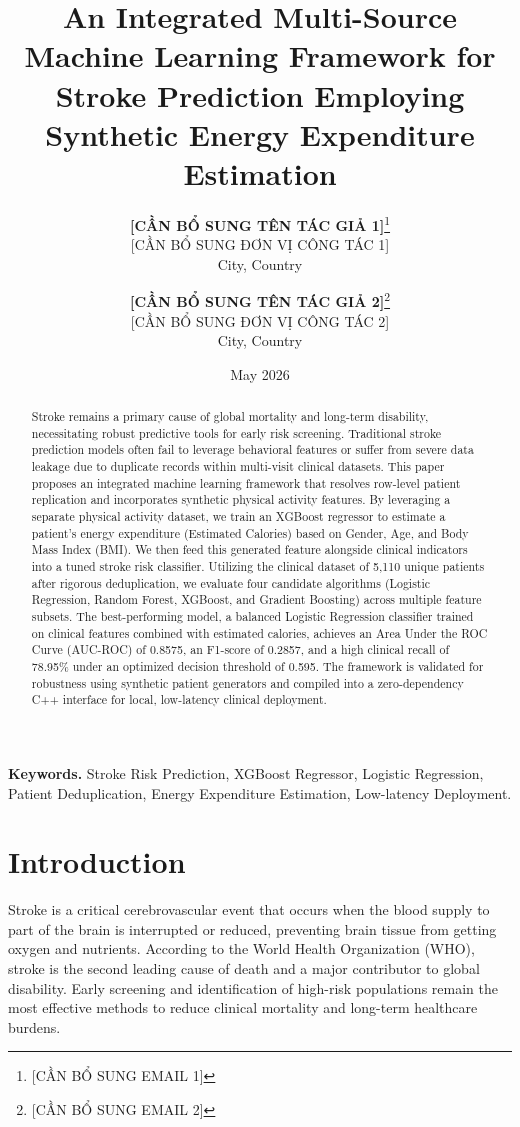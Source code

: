 \documentclass[11pt,letterpaper]{article}
\title{\Large \textbf{An Integrated Multi-Source Machine Learning Framework for Stroke Prediction Employing Synthetic Energy Expenditure Estimation}}
\author{
  \textbf{[CẦN BỔ SUNG TÊN TÁC GIẢ 1]}\thanks{[CẦN BỔ SUNG EMAIL 1]} \\
  \small [CẦN BỔ SUNG ĐƠN VỊ CÔNG TÁC 1] \\
  \small City, Country
  \and
  \textbf{[CẦN BỔ SUNG TÊN TÁC GIẢ 2]}\thanks{[CẦN BỔ SUNG EMAIL 2]} \\
  \small [CẦN BỔ SUNG ĐƠN VỊ CÔNG TÁC 2] \\
  \small City, Country
}
\date{\small May 2026}
\begin{document}
\maketitle

\begin{abstract}
\noindent Stroke remains a primary cause of global mortality and long-term disability, necessitating robust predictive tools for early risk screening. Traditional stroke prediction models often fail to leverage behavioral features or suffer from severe data leakage due to duplicate records within multi-visit clinical datasets. This paper proposes an integrated machine learning framework that resolves row-level patient replication and incorporates synthetic physical activity features. By leveraging a separate physical activity dataset, we train an XGBoost regressor to estimate a patient's energy expenditure (Estimated Calories) based on Gender, Age, and Body Mass Index (BMI). We then feed this generated feature alongside clinical indicators into a tuned stroke risk classifier. Utilizing the clinical dataset of 5,110 unique patients after rigorous deduplication, we evaluate four candidate algorithms (Logistic Regression, Random Forest, XGBoost, and Gradient Boosting) across multiple feature subsets. The best-performing model, a balanced Logistic Regression classifier trained on clinical features combined with estimated calories, achieves an Area Under the ROC Curve (AUC-ROC) of 0.8575, an F1-score of 0.2857, and a high clinical recall of 78.95\% under an optimized decision threshold of 0.595. The framework is validated for robustness using synthetic patient generators and compiled into a zero-dependency C++ interface for local, low-latency clinical deployment.
\end{abstract}

\vspace{0.5em}
\noindent \textbf{Keywords.} Stroke Risk Prediction, XGBoost Regressor, Logistic Regression, Patient Deduplication, Energy Expenditure Estimation, Low-latency Deployment.

\section{Introduction}
Stroke is a critical cerebrovascular event that occurs when the blood supply to part of the brain is interrupted or reduced, preventing brain tissue from getting oxygen and nutrients. According to the World Health Organization (WHO), stroke is the second leading cause of death and a major contributor to global disability. Early screening and identification of high-risk populations remain the most effective methods to reduce clinical mortality and long-term healthcare burdens.
\end{document}
